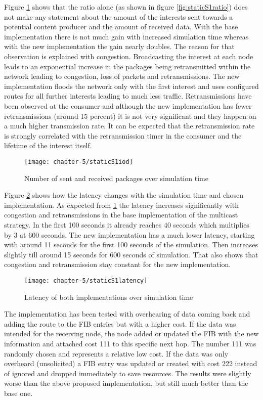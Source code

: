 Figure \ref{fig:staticS1iod} shows that the ratio alone (as shown in figure \ref{fig:staticS1ratio}) does not make any statement about the amount of the interests sent towards a potential content producer and the amount of received data. With the base implementation there is not much gain with increased simulation time whereas with the new implementation the gain nearly doubles. The reason for that observation is explained with congestion. Broadcasting the interest at each node leads to an exponential increase in the packages being retransmitted within the network leading to congestion, loss of packets and retransmissions. The new implementation floods the network only with the first interest and uses configured routes for all further interests leading to much less traffic. Retransmissions have been observed at the consumer and although the new implementation has fewer retransmissions (around 15 percent) it is not very significant and they happen on a much higher transmission rate. It can be expected that the retransmission rate is strongly correlated with the retransmission timer in the consumer and the lifetime of the interest itself.

\begin{figure}[H]
  \centering
  \texttt{[image: chapter-5/staticS1iod]}
  \caption{Number of sent and received packages over simulation time}
  \label{fig:staticS1iod}
\end{figure}

Figure \ref{fig:staticS1latency} shows how the latency changes with the simulation time and chosen implementation. As expected from \ref{fig:staticS1iod} the latency increases significantly with congestion and retransmissions in the base implementation of the multicast strategy. In the first 100 seconds it already reaches 40 seconds which multiplies by 3 at 600 seconds. The new implementation has a much lower latency, starting with around 11 seconds for the first 100 seconds of the simulation. Then increases slightly till around 15 seconds for 600 seconds of simulation. That also shows that congestion and retransmission stay constant for the new implementation.

\begin{figure}[H]
  \centering
  \texttt{[image: chapter-5/staticS1latency]}
  \caption{Latency of both implementations over simulation time}
  \label{fig:staticS1latency}
\end{figure}

The implementation has been tested with overhearing of data coming back and adding the route to the FIB entries but with a higher cost. If the data was intended for the receiving node, the node added or updated the FIB with the new information and attached cost 111 to this specific next hop. The number 111 was randomly chosen and represents a relative low cost. If the data was only overheard (unsolicited) a FIB entry was updated or created with cost 222 instead of ignored and dropped immediately to save resources. The results were slightly worse than the above proposed implementation, but still much better than the base one.

